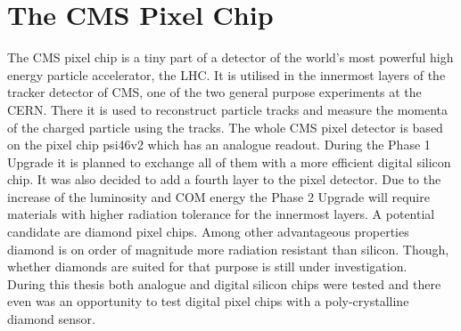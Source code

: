 \documentclass[british,11pt,a4paper]{memoir}
\begin{document}
\tableofcontents
\chapter{The CMS Pixel Chip}
The CMS pixel chip is a tiny part of a detector of the world's most powerful high energy particle accelerator, the \ac{LHC}. It is utilised in the innermost layers of the tracker detector of \ac{CMS}, one of the two general purpose experiments at the \ac{CERN}. There it is used to reconstruct particle tracks and measure the momenta of the charged particle using the tracks. The whole \ac{CMS} pixel detector is based on the pixel chip psi46v2 which has an analogue readout. During the Phase 1 Upgrade it is planned to exchange all of them with a more efficient digital silicon chip. It was also decided to add a fourth layer to the pixel detector. Due to the increase of the luminosity and \ac{COM} energy the Phase 2 Upgrade will require materials with higher radiation tolerance for the innermost layers. A potential candidate are diamond pixel chips. Among other advantageous properties diamond is on order of magnitude more radiation resistant than silicon. Though, whether diamonds are suited for that purpose is still under investigation.\\
During this thesis both analogue and digital silicon chips were tested and there even was an opportunity to test digital pixel chips with a poly-crystalline diamond sensor.
\end{document}
